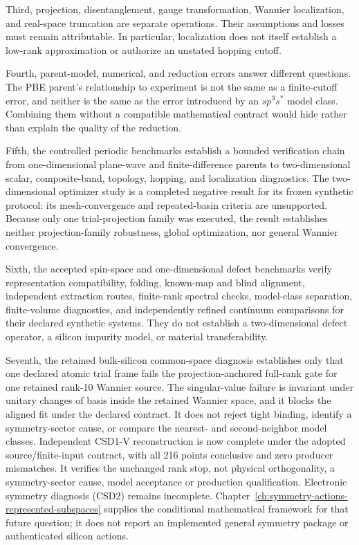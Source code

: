Third, projection, disentanglement, gauge transformation, Wannier localization,
and real-space truncation are separate operations. Their assumptions and losses
must remain attributable. In particular, localization does not itself establish
a low-rank approximation or authorize an unstated hopping cutoff.

Fourth, parent-model, numerical, and reduction errors answer different
questions. The PBE parent's relationship to experiment is not the same as a
finite-cutoff error, and neither is the same as the error introduced by an
$sp^3s^{\ast}$ model class. Combining them without a compatible mathematical
contract would hide rather than explain the quality of the reduction.

Fifth, the controlled periodic benchmarks establish a bounded verification
chain from one-dimensional plane-wave and finite-difference parents to
two-dimensional scalar, composite-band, topology, hopping, and localization
diagnostics. The two-dimensional optimizer study is a completed negative result
for its frozen synthetic protocol: its mesh-convergence and repeated-basin
criteria are unsupported. Because only one trial-projection family was
executed, the result establishes neither projection-family robustness, global
optimization, nor general Wannier convergence.

Sixth, the accepted spin-space and one-dimensional defect benchmarks verify
representation compatibility, folding, known-map and blind alignment,
independent extraction routes, finite-rank spectral checks, model-class
separation, finite-volume diagnostics, and independently refined continuum
comparisons for their declared synthetic systems. They do not establish a
two-dimensional defect operator, a silicon impurity model, or material
transferability.

Seventh, the retained bulk-silicon common-space diagnosis establishes only that
one declared atomic trial frame fails the projection-anchored full-rank gate for
one retained rank-10 Wannier source. The singular-value failure is invariant
under unitary changes of basis inside the retained Wannier space, and it blocks
the aligned fit under the declared contract. It does not reject tight binding,
identify a symmetry-sector cause, or compare the nearest- and second-neighbor
model classes. Independent CSD1-V reconstruction is now complete under the
adopted source/finite-input contract, with all 216 points conclusive and zero
producer mismatches. It verifies the unchanged rank stop, not physical
orthogonality, a symmetry-sector cause, model acceptance or production
qualification. Electronic symmetry diagnosis (CSD2) remains incomplete.
Chapter~\ref{ch:symmetry-actions-represented-subspaces} supplies the conditional
mathematical framework for that future question; it does not report an
implemented general symmetry package or authenticated silicon actions.

